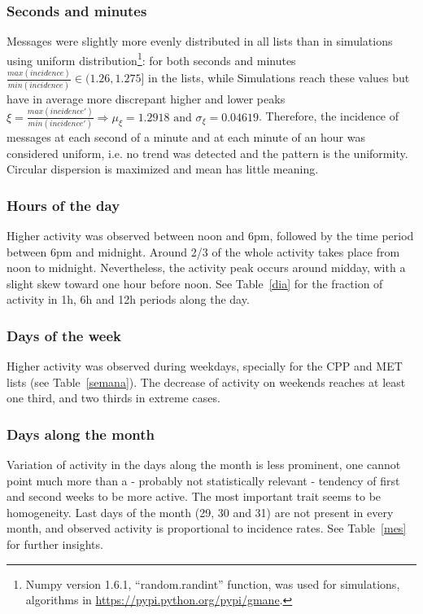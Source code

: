 \documentclass[%
 aip,
 jmp,%
 amsmath,amssymb,
 reprint,%
]{revtex4-1}
\begin{document}
\subsubsection{Seconds and minutes}
Messages were slightly more evenly distributed in all lists than in simulations using uniform distribution\footnote{Numpy version 1.6.1, ``random.randint'' function, was used for simulations, algorithms in \url{https://pypi.python.org/pypi/gmane}.}: for both seconds and minutes $\frac{max(incidence)}{min(incidence)} \in (1.26,1.275]$ in the lists, while Simulations reach these values but have in average more discrepant higher and lower peaks $\xi=\frac{max(incidence')}{min(incidence')} \Rightarrow \mu_\xi=1.2918 \text{ and } \sigma_\xi=0.04619$.
Therefore, the incidence of messages at each second of a minute and at each minute of an hour was considered uniform, i.e. no trend was detected and the pattern is the uniformity. Circular dispersion is maximized and mean has little meaning.

\subsubsection{Hours of the day}
Higher activity was observed between noon and 6pm, followed by the time period between 6pm and midnight. Around 2/3 of the whole activity takes place from noon to midnight. Nevertheless, the activity peak occurs around midday, with a slight skew toward one hour before noon. See Table~\ref{dia} for the fraction of activity in 1h, 6h and 12h periods along the day.

\subsubsection{Days of the week}
Higher activity was observed during weekdays, specially for the CPP and MET lists (see Table~\ref{semana}). The decrease of activity on weekends reaches at least one third, and two thirds in extreme cases.

\subsubsection{Days along the month}
Variation of activity in the days along the month is less prominent, one cannot point much more than a - probably not statistically relevant - tendency of first and second weeks to be more active. The most important trait seems to be homogeneity. Last days of the month (29, 30 and 31) are not present in every month, and observed activity is proportional to incidence rates. See Table~\ref{mes} for further insights. 
\end{document}
